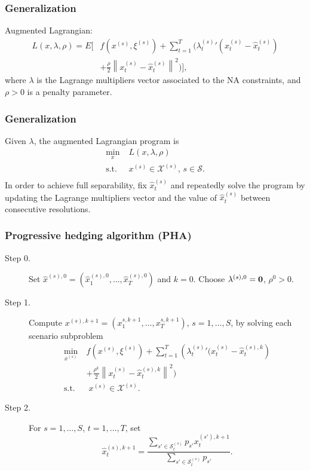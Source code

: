 \documentclass[french]{beamer}
\def\cS{\mathcal{S}}
\begin{document}
\begin{frame}
\frametitle{Generalization}

Augmented Lagrangian:
\begin{align*}
L(x,\lambda,\rho) =  E \Biggl[ & f\left( x^{(s)}, \xi^{(s)} \right) + \sum_{t = 1}^T \biggl( {\lambda_t^{(s)}}' \left(x_t^{(s)} - \hat{x}_t^{(s)}\right) \\
& + \frac{\rho}{2} \left\| x_t^{(s)} - \hat{x}_t^{(s)} \right\|^2 \biggr) \Biggr],
\end{align*}
where $\lambda$ is the Lagrange multipliers vector associated to the NA constraints, and $\rho > 0$ is a penalty parameter.

\end{frame}

\begin{frame}
\frametitle{Generalization}

Given $\lambda$, the augmented Lagrangian program is
\begin{equation}
\begin{aligned}
\min_{x} & \; L(x,\lambda,\rho)\\
\text{s.t.} & \; x^{(s)} \in \mathcal{X}^{(s)}, \, s \in \mathcal{S}.\\
\end{aligned}
\label{Gen-PHA-Form}
\end{equation}
In order to achieve full separability, fix $\hat{x}_t^{(s)}$ and repeatedly solve the program by updating the Lagrange multipliers vector and the value of $\hat{x}_t^{(s)}$ between consecutive resolutions.

\end{frame}

\begin{frame}
\frametitle{Progressive hedging algorithm (PHA)}

\begin{description}
	\item[Step 0.]
	Set $\hat{x}^{(s) ,0} = \left(\hat{x}_1^{(s),0}, \dots, \hat{x}_T^{(s),0}\right)$ and $k = 0$. Choose $\lambda^{(s),0} = \bf{0}$, $\rho^0 > 0$.
	\item[Step 1.]
	Compute $x^{(s),k+1} =  (x_1^{s,k+1}, \dots, x_T^{s,k+1})$, $s = 1,\ldots,S$, by solving each scenario subproblem
	$$
	\begin{aligned}
	\min_{x^{(s)}} \ &  f\left( x^{(s)}, \xi^{(s)} \right) + \sum_{t = 1}^T \left( {\lambda_t^{(s)}}' \biggl(x_t^{(s)} - \hat{x}_t^{(s),k}\right) \\
	& + \frac{\rho^k}{2} \left\| x_t^{(s)} - \hat{x}_t^{(s),k} \right\|^2 \biggr)\\
	\text{s.t.} & \; x^{(s)}  \in \mathcal{X}^{(s)}.
	\end{aligned}
	$$
	\item[Step 2.]
	For $s = 1,\ldots,S$, $t = 1,\ldots,T$, set
	\[
	\hat{x}_t^{(s),k+1} = \frac{\sum_{s' \in \cS_{t}^{(s)}} p_{s'} x_t^{(s'),k+1}}{\sum_{s' \in \cS_t^{(s)}} p_{s'}}.
	\]
\end{description}

\end{frame}
\end{document}
